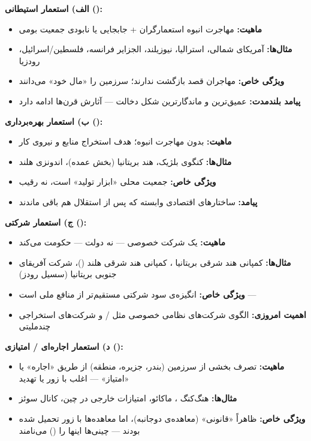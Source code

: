 \begin{tcolorbox}[wavebox, title={زیرشاخه‌های استعمار}]

\textbf{الف) استعمار استیطانی ():}
\begin{itemize}
\item \textbf{ماهیت:} مهاجرت انبوه استعمارگران + جابجایی یا نابودی جمعیت
  بومی
\item \textbf{مثال‌ها:} آمریکای شمالی، استرالیا، نیوزیلند، الجزایر فرانسه،
  فلسطین/اسرائیل، رودزیا
\item \textbf{ویژگی خاص:} مهاجران قصد بازگشت ندارند؛ سرزمین را «مال خود»
  می‌دانند
\item \textbf{پیامد بلندمدت:} عمیق‌ترین و ماندگارترین شکل دخالت — آثارش
  قرن‌ها ادامه دارد
\end{itemize}

\tcblower

\textbf{ب) استعمار بهره‌برداری ():}
\begin{itemize}
\item \textbf{ماهیت:} بدون مهاجرت انبوه؛ هدف استخراج منابع و نیروی کار
\item \textbf{مثال‌ها:} کنگوی بلژیک، هند بریتانیا (بخش عمده)، اندونزی
  هلند
\item \textbf{ویژگی خاص:} جمعیت محلی «ابزار تولید» است، نه رقیب
\item \textbf{پیامد:} ساختارهای اقتصادی وابسته که پس از استقلال هم باقی
  ماندند
\end{itemize}

\tcblower

\textbf{ج) استعمار شرکتی ():}
\begin{itemize}
\item \textbf{ماهیت:} یک شرکت خصوصی — نه دولت — حکومت می‌کند
\item \textbf{مثال‌ها:} کمپانی هند شرقی بریتانیا ،
  کمپانی هند شرقی هلند ()، شرکت آفریقای جنوبی بریتانیا (سسیل رودز)
\item \textbf{ویژگی خاص:} انگیزه‌ی سود شرکتی مستقیم‌تر از منافع ملی
  است — 
\item \textbf{اهمیت امروزی:} الگوی شرکت‌های نظامی خصوصی مثل
  / و شرکت‌های استخراجی چندملیتی
\end{itemize}

\tcblower

\textbf{د) استعمار اجاره‌ای / امتیازی ():}
\begin{itemize}
\item \textbf{ماهیت:} تصرف بخشی از سرزمین (بندر، جزیره، منطقه) از طریق
  «اجاره» یا «امتیاز» — اغلب با زور یا تهدید
\item \textbf{مثال‌ها:} هنگ‌کنگ ، ماکائو، امتیازات
  خارجی در چین، کانال سوئز
\item \textbf{ویژگی خاص:} ظاهراً «قانونی» (معاهده‌ی دوجانبه)، اما
  معاهده‌ها با زور تحمیل شده بودند — چینی‌ها اینها را
   () می‌نامند
\end{itemize}
\end{tcolorbox}

